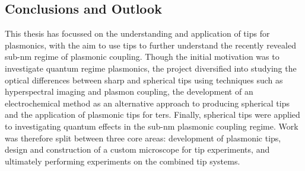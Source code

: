 \documentclass[12pt, a4paper, oneside]{book}
\begin{document}
\begin{singlespace}
\chapter{Conclusions and Outlook}
\end{singlespace}


This thesis has focussed on the understanding and application of tips for plasmonics, with the aim to use tips to further understand the recently revealed sub-nm regime of plasmonic coupling. Though the initial motivation was to investigate quantum regime plasmonics, the project diversified into studying the optical differences between sharp and spherical tips using techniques such as hyperspectral imaging and plasmon coupling, the development of an electrochemical method as an alternative approach to producing spherical tips and the application of plasmonic tips for \gls{ters}. Finally, spherical tips were applied to investigating quantum effects in the sub-nm plasmonic coupling regime. Work was therefore split between three core areas: development of plasmonic tips, design and construction of a custom microscope for tip experiments, and ultimately performing experiments on the combined tip systems.
\end{document}
